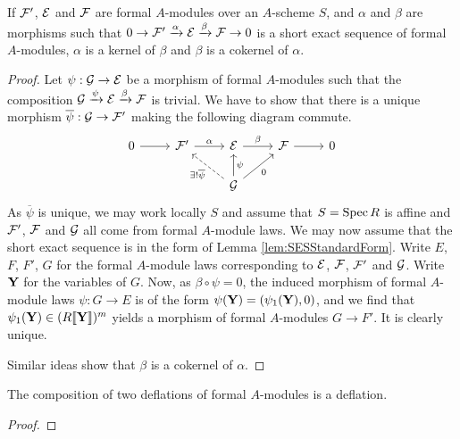 \documentclass[../main.tex]{subfiles}
\begin{document}
\begin{lem}
  If $\mathcal{F}'$, $\mathcal{E}$ and $\mathcal{F}$ are formal $A$-modules over an $A$-scheme $S$,
  and $\alpha$ and $\beta$ are morphisms such that 
  $0 \to \mathcal{F}' \xrightarrow{\alpha} \mathcal{E} \xrightarrow{\beta} \mathcal{F} \to 0$ 
  is a short exact sequence of formal $A$-modules, $\alpha$ is a kernel of
  $\beta$ and $\beta$ is a cokernel of $\alpha$. 
\begin{proof}
  Let $\psi: \mathcal{G} \to \mathcal{E}$ be a morphism of formal $A$-modules such that
  the composition $\mathcal{G} \xrightarrow{\psi} \mathcal{E} \xrightarrow{\beta} \mathcal{F}$ is trivial. 
  We have to show that there is a unique morphism $\overline \psi: \mathcal{G} \to 
  \mathcal{F}'$ making the following diagram commute.
  \begin{equation*}
    \begin{tikzcd}[ampersand replacement=\&]
    	0 \& {\cF'} \& \cE \& \cF \& 0 \\
    	\&\& \cG
    	\arrow[from=1-1, to=1-2]
    	\arrow["\alpha", from=1-2, to=1-3]
    	\arrow["\beta", from=1-3, to=1-4]
    	\arrow[from=1-4, to=1-5]
    	\arrow["{\exists!\overline \psi}", dashed, from=2-3, to=1-2]
    	\arrow["{\psi}"', from=2-3, to=1-3]
    	\arrow["0"', from=2-3, to=1-4]
    \end{tikzcd}
  \end{equation*}
  As $\overline \psi$ is unique, we may work locally $S$ and assume that $S =
  \operatorname{Spec} R$ is affine and 
  $\mathcal{F}'$, $\mathcal{F}$ and $\mathcal{G}$ all come from formal $A$-module laws. We may
  now assume that the short exact sequence is in the form of Lemma
  \ref{lem:SESStandardForm}. Write $E$, $F$, $F'$, $G$ for the 
  formal $A$-module laws corresponding to $\mathcal{E}$, $\mathcal{F}$, $\mathcal{F}'$ and 
  $\mathcal{G}$. Write $\mathbf{Y}$ for the variables of $G$. Now, as 
  $\beta \circ \psi = 0$, the induced morphism of
  formal $A$-module laws $\psi: G \to E$ is of the form $\psi(\mathbf{Y}) =
  (\psi_1(\mathbf{Y}), 0)$, and we find that $\psi_1(\mathbf{Y}) \in (R\llbracket \mathbf{Y} \rrbracket)^m$
  yields a morphism of formal $A$-modules $G \to F'$. It is clearly unique. 
  
  Similar ideas show that $\beta$ is a cokernel of $\alpha$. 
\end{proof}

\end{lem}

\begin{lem}
  The composition of two deflations of formal $A$-modules is a deflation.
\begin{proof}
\end{proof}
\end{lem}
\end{document}
